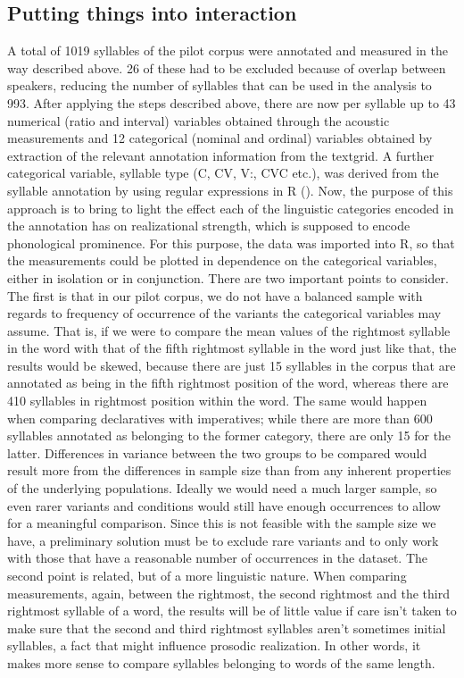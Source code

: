 \documentclass[output=paper]{LSP/langsci}
\begin{document}
\subsection{Putting things into interaction}
A total of 1019 syllables of the pilot corpus were annotated and measured in the way described above. 26 of these had to be excluded because of overlap between speakers, reducing the number of syllables that can be used in the analysis to 993. After applying the steps described above, there are now per syllable up to 43 numerical (ratio and interval) variables obtained through the acoustic measurements and 12 categorical (nominal and ordinal) variables obtained by extraction of the relevant annotation information from the textgrid. A further categorical variable, syllable type (C, CV, V\textipa:, CVC etc.), was derived from the syllable annotation by using regular expressions in {R} (\citealt{Rtool}). Now, the purpose of this approach is to bring to light the effect each of the linguistic categories encoded in the annotation has on realizational strength, which is supposed to encode phonological prominence. For this purpose, the data was imported into {R}, so that the measurements could be plotted in dependence on the categorical variables, either in isolation or in conjunction. There are two important points to consider. The first is that in our pilot corpus, we do not have a balanced sample with regards to frequency of occurrence of the variants the categorical variables may assume. That is, if we were to compare the mean values of the rightmost syllable in the word with that of the fifth rightmost syllable in the word just like that, the results would be skewed, because there are just 15 syllables in the corpus that are annotated as being in the fifth rightmost position of the word, whereas there are 410 syllables in rightmost position within the word. The same would happen when comparing declaratives with imperatives; while there are more than 600 syllables annotated as belonging to the former category, there are only 15 for the latter. Differences in variance between the two groups to be compared would result more from the differences in sample size than from any inherent properties of the underlying populations. Ideally we would need a much larger sample, so even rarer variants and conditions would still have enough occurrences to allow for a meaningful comparison. Since this is not feasible with the sample size we have, a preliminary solution must be to exclude rare variants and to only work with those that have a reasonable number of occurrences in the dataset. The second point is related, but of a more linguistic nature. When comparing measurements, again, between the rightmost, the second rightmost and the third rightmost syllable of a word, the results will be of little value if care isn’t taken to make sure that the second and third rightmost syllables aren’t sometimes initial syllables, a fact that might influence prosodic realization. In other words, it makes more sense to compare syllables belonging to words of the same length. 
\end{document}
